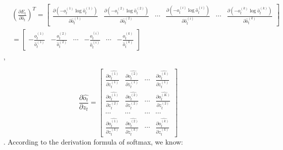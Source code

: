 \documentclass[oneside,solution]{seu-ml-assign}
\begin{document}
\[
  \begin{aligned}
     & \left(\frac{\partial E_t}{\partial \hat{o}_t}\right)^T = \begin{bmatrix}
                                                                  \frac{\partial (-o_t^{(1)} \log \hat{o}_t^{(1)})}{\partial \hat{o}_t^{(1)}} &
                                                                  \frac{\partial (-o_t^{(2)} \log \hat{o}_t^{(2)})}{\partial \hat{o}_t^{(2)}} &
                                                                  \cdots                                                                      &
                                                                  \frac{\partial (-o_t^{(i)} \log \hat{o}_t^{(i)})}{\partial \hat{o}_t^{(i)}} &
                                                                  \cdots                                                                      &
                                                                  \frac{\partial (-o_t^{(k)} \log \hat{o}_t^{(k)})}{\partial \hat{o}_t^{(k)}}
                                                                \end{bmatrix} \\
     & = \begin{bmatrix}
           -\frac{o_t^{(1)}}{\hat{o}_t^{(1)}} &
           -\frac{o_t^{(2)}}{\hat{o}_t^{(2)}} &
           \cdots                             &
           -\frac{o_t^{(i)}}{\hat{o}_t^{(i)}} &
           \cdots                             &
           -\frac{o_t^{(k)}}{\hat{o}_t^{(k)}}
         \end{bmatrix}
  \end{aligned}
\],


\begin{equation}\frac{\partial\hat{o_t}}{\partial z_t}=\begin{bmatrix}\frac{\partial\hat{o_t^{(1)}}}
    {\partial z_t^{(1)}}                               & \frac{\partial\hat{o_t^{(2)}}}{\partial z_t^{(1)}} & \cdots                                             & \frac{\partial\hat{o_t^{(k)}}}
    {\partial z_t^{(1)}}                                                                                                                                                                          \\\frac{\partial\hat{o_t^{(1)}}}{\partial z_t^{(2)}}&\frac{\partial\hat{o_t^{(2)}}}
    {\partial z_t^{(2)}}                               & \cdots                                             & \frac{\partial\hat{o_t^{(K)}}}{\partial z_t^{(2)}}                                  \\\cdots&\cdots&\cdots&\cdots\\
    \frac{\partial\hat{o_t^{(1)}}}{\partial z_t^{(k)}} & \frac{\partial\hat{o_t^{(2)}}}{\partial z_t^{(k)}} & \cdots                                             &
    \frac{\partial\hat{o_t^{(k)}}}{\partial z_t^{(k)}}\end{bmatrix}\end{equation}.
According to the derivation formula of softmax, we know:
\end{document}

